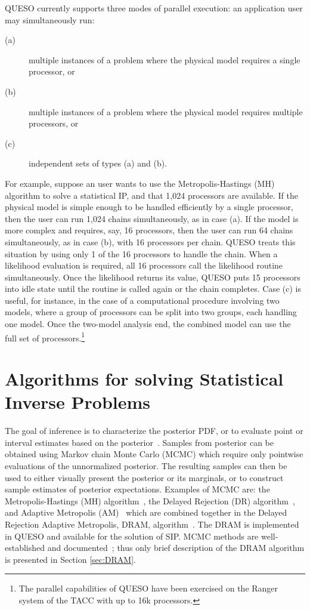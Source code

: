 QUESO currently supports three modes of parallel execution:
an application user may simultaneously run:
\begin{description}
\item[(a)] multiple instances of a problem where the physical model requires a single processor, or
\item[(b)] multiple instances of a problem where the physical model requires multiple processors, or
\item[(c)] independent sets of types (a) and (b).
\end{description}

For example, suppose an user wants to use the Metropolis-Hastings (MH) algorithm to solve a statistical IP, and that 1,024 processors are available.
If the physical model is simple enough to be handled efficiently by a single processor, then the user can run 1,024 chains simultaneously, as in case (a).
If the model is more complex and requires, say, 16 processors, then the user can run 64 chains simultaneously, as in case (b), with 16 processors per chain.
QUESO treats this situation by using only 1 of the 16 processors to handle the chain.
When a likelihood evaluation is required, all 16 processors call the likelihood routine simultaneously.
Once the likelihood returns its value, QUESO puts  15 processors into idle state until the routine is called again or the chain completes.
Case (c) is useful, for instance, in the case of a computational procedure involving two models,
where a group of processors can be split into two groups, each handling one model.
Once the two-model analysis end, the combined model can use the full set of processors.\footnote{The parallel capabilities of QUESO have been exercised on the Ranger system of the TACC \cite{tacc} with up to 16k processors.}



\section{Algorithms for solving Statistical Inverse Problems}

The goal of inference is to characterize the posterior PDF, or to evaluate
point or interval estimates based on the posterior~\cite{HuMa01}.  Samples from
posterior can be obtained using Markov chain Monte Carlo (MCMC) which require
only pointwise evaluations of the unnormalized posterior.  The resulting
samples can then be used to either visually present the posterior or its
marginals, or to construct sample estimates of posterior expectations.
Examples of MCMC are: the Metropolis-Hastings (MH)
algorithm~\cite{Metr_1953,Hast_1970}, the Delayed Rejection (DR)
algorithm~\cite{GrMi01,Mira01}, and Adaptive Metropolis (AM)~\cite{HaSaTa01}
which are combined together in the Delayed Rejection Adaptive Metropolis, DRAM,
algorithm~\cite{HaLaMiSa06}. The DRAM is implemented in QUESO and available for
the solution of SIP. MCMC methods are well-established and
documented~\cite{CaSo07,GrMi01,HaLaMiSa06,HaSaTa01,Hast_1970,KaSo05,Laine08,Metr_1953,Mira01};
thus only brief description of the DRAM algorithm is presented in Section
\ref{sec:DRAM}. 


